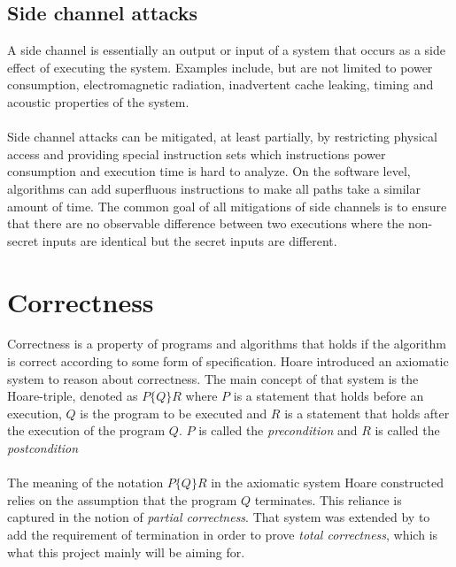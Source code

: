 \documentclass[fleqn]{kththesis}
\begin{document}
\subsection{Side channel attacks}
A side channel is essentially an output or input of a system that occurs as a side effect of executing the system. Examples include, but are not limited to power consumption, electromagnetic radiation, inadvertent cache leaking, timing and acoustic properties of the system. 
\paragraph{}
Side channel attacks can be mitigated, at least partially, by restricting physical access and providing special instruction sets which instructions power consumption and execution time is hard to analyze. On the software level, algorithms can add superfluous instructions to make all paths take a similar amount of time. The common goal of all mitigations of side channels is to ensure that there are no observable difference between two executions where the non-secret inputs are identical but the secret inputs are different.


\section{Correctness}
Correctness is a property of programs and algorithms that holds if the algorithm is correct according to some form of specification.
Hoare introduced an axiomatic system to reason about correctness. The main concept of that system is the Hoare-triple, denoted as $P \{Q\} R$ where $P$ is a statement that holds before an execution, $Q$ is the program to be executed and $R$ is a statement that holds after the execution of the program $Q$. $P$ is called the \emph{precondition} and $R$ is called the \emph{postcondition}

\paragraph{}
The meaning of the notation $P \{Q\} R$ in the axiomatic system Hoare constructed relies on the assumption that the program $Q$ terminates. This reliance is captured in the notion of \emph{partial correctness}. That system was extended by \textcite{total_correctness} to add the requirement of termination in order to prove \emph{total correctness}, which is what this project mainly will be aiming for.
\end{document}
